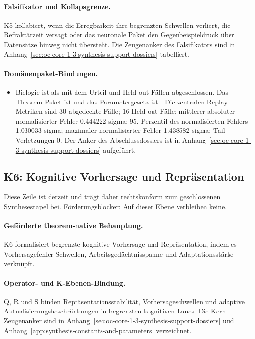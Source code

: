 \paragraph{Falsifikator und Kollapsgrenze.}
K5 kollabiert, wenn die Erregbarkeit ihre begrenzten Schwellen verliert, die Refraktärzeit versagt oder das neuronale Paket den Gegenbeispieldruck über Datensätze hinweg nicht übersteht.
Die Zeugenanker des Falsifikators sind in Anhang~\ref{sec:oc-core-1-3-synthesis-support-dossiers} tabelliert.

\paragraph{Domänenpaket-Bindungen.}
\begin{itemize}[leftmargin=1.6em,nosep]
\item Biologie ist als  mit dem Urteil  und  Held-out-Fällen abgeschlossen. Das Theorem-Paket ist  und das Parametergesetz ist . Die zentralen Replay-Metriken sind 30 abgedeckte Fälle; 16 Held-out-Fälle; mittlerer absoluter normalisierter Fehler 0.444222 sigma; 95. Perzentil des normalisierten Fehlers 1.030033 sigma; maximaler normalisierter Fehler 1.438582 sigma; Tail-Verletzungen 0. Der Anker des Abschlussdossiers ist in Anhang~\ref{sec:oc-core-1-3-synthesis-support-dossiers} aufgeführt.
\end{itemize}

\subsection{K6: Kognitive Vorhersage und Repräsentation}
\label{sec:oc-core-1-3-synthesis-k6}
Diese Zeile ist derzeit  und trägt daher rechtskonform zum geschlossenen Synthesestapel bei.
Förderungsblocker: Auf dieser Ebene verbleiben keine.

\paragraph{Geförderte theorem-native Behauptung.}
K6 formalisiert begrenzte kognitive Vorhersage und Repräsentation, indem es Vorhersagefehler-Schwellen, Arbeitsgedächtnisspanne und Adaptationsstärke verknüpft.

\paragraph{Operator- und K-Ebenen-Bindung.}
Q, R und S binden Repräsentationsstabilität, Vorhersageschwellen und adaptive Aktualisierungsbeschränkungen in begrenzten kognitiven Lanes.
Die Kern-Zeugenanker sind in Anhang~\ref{sec:oc-core-1-3-synthesis-support-dossiers} und Anhang~\ref{app:synthesis-constants-and-parameters} verzeichnet.

